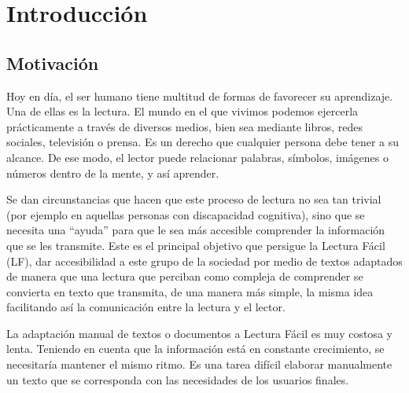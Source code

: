 \chapter{Introducción}
\label{cap:introduccion}


\section{Motivación}
Hoy en día, el ser humano tiene multitud de formas de favorecer su aprendizaje. Una de ellas es la lectura. El mundo en el que vivimos podemos ejercerla prácticamente a través de diversos medios, bien sea mediante libros, redes sociales, televisión o prensa. Es un derecho que cualquier persona debe tener a su alcance. De ese modo, el lector puede relacionar palabras, símbolos, imágenes o números dentro de la mente, y así aprender.


 \setlength{\parskip}{10pt}

 Se dan circunstancias que hacen que este proceso de lectura no sea tan trivial (por ejemplo en aquellas personas con discapacidad cognitiva), sino que se necesita una ``ayuda'' para que le sea más accesible comprender la información que se les transmite. Este es el principal objetivo que persigue la Lectura Fácil (LF), dar accesibilidad a este grupo de la sociedad por medio de textos adaptados de manera que una lectura que perciban como compleja de comprender se convierta en texto que transmita, de una manera más simple, la misma idea facilitando así la comunicación entre la lectura y el lector.
 
 \setlength{\parskip}{10pt}
 
 

 
La adaptación manual de textos o documentos a Lectura Fácil es muy costosa y lenta. Teniendo en cuenta que la información está en constante crecimiento, se necesitaría mantener el mismo ritmo. Es una tarea difícil elaborar manualmente un texto que se corresponda con las necesidades de los usuarios finales. 
 
 
